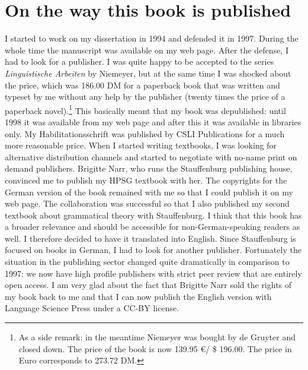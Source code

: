 \section*{On the way this book is published}

I started to work on my dissertation in 1994 and defended it in 1997. During the whole time the
manuscript was available on my web page. After the defense, I had to look for a publisher. I was
quite happy to be accepted to the series \emph{Linguistische Arbeiten} by Niemeyer, but at the same time I
was shocked about the price, which was 186.00 DM for a paperback book that was written and typeset
by me without any help by the publisher (twenty times the price of a paperback novel).\footnote{
  As a side remark: in the meantime Niemeyer was bought by de Gruyter and closed down. The price of the book is now
  139.95 \euro / \$ 196.00. The price in Euro corresponds to 273.72 DM. 
} This
basically meant that my book was depublished: until 1998 it was available from my web page and after
this it was available in libraries only. My Habilitationsschrift was published by CSLI Publications
for a much more reasonable price. When I started writing textbooks, I was looking for alternative
distribution channels and started to negotiate with no-name print on demand publishers. Brigitte Narr,
who runs the Stauffenburg publishing house, convinced me to publish my HPSG textbook with her. The
copyrights for the German version of the book remained with me so that I could publish it on my web page. The collaboration was successful so that I also published my second textbook about
grammatical theory with Stauffenburg. I think that this book has a broader relevance and should be
accessible for non-German-speaking readers as well. I therefore decided to have it translated into
English. Since Stauffenburg is focused on books in German, I had to look for another publisher. Fortunately the situation in the publishing sector changed quite dramatically in comparison
to 1997: we now have high profile publishers with strict peer review that are entirely open access. I am very
glad about the fact that Brigitte Narr sold the rights of my book back to me and that I can now 
publish the English version with Language Science Press under a CC-BY license.

